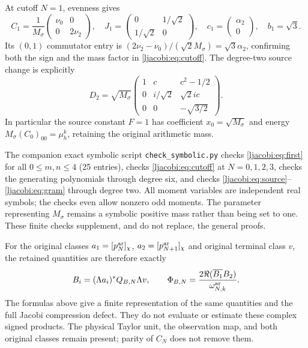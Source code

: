 At cutoff $N=1$, evenness gives
\[
 C_1=\frac1{M_\sigma}\begin{pmatrix}\nu_0&0\\0&2\nu_2\end{pmatrix},
 \quad J_1=\begin{pmatrix}0&1/\sqrt2\\1/\sqrt2&0\end{pmatrix},
 \quad c_1=\begin{pmatrix}\alpha_2\\0\end{pmatrix},\quad b_1=\sqrt3.
\]
Its $(0,1)$ commutator entry is
$(2\nu_2-\nu_0)/(\sqrt2M_\sigma)=\sqrt3\alpha_2$,
confirming both the sign and the mass factor in \eqref{ljacobi:eq:cutoff}.
The degree-two source change is explicitly
\[
 D_2=\sqrt{M_\sigma}
 \begin{pmatrix}
 1&c&c^2-1/2\\
 0&i/\sqrt2&\sqrt2ic\\
 0&0&-\sqrt{3/2}
 \end{pmatrix}.
\]
In particular the source constant $F=1$ has coefficient
$x_0=\sqrt{M_\sigma}$ and energy
$M_\sigma(C_0)_{00}=\mu_h^k$, retaining the original arithmetic mass.

The companion exact symbolic script \texttt{check\_symbolic.py}
checks \eqref{ljacobi:eq:first} for all $0\leq m,n\leq4$ (25 entries),
checks \eqref{ljacobi:eq:cutoff} at $N=0,1,2,3$, checks the generating
polynomials through degree six, and checks
\eqref{ljacobi:eq:source}--\eqref{ljacobi:eq:gram} through degree two. All moment
variables are independent real symbols; the checks even allow
nonzero odd moments. The parameter representing $M_\sigma$ remains
a symbolic positive mass rather than being set to one. These
finite checks supplement, and do not replace, the general proofs.

For the original classes $a_1=[p_N^{\rm ar}]_\chi$,
$a_2=[p_{N+1}^{\rm ar}]_\chi$ and original terminal class $v$, the
retained quantities are therefore exactly
\[
 B_i=(\Lambda a_i)^*Q_{B,N}\Lambda v,\qquad
 \Phi_{B,N}=\frac{2\Re(\overline{B_1}B_2)}{\omega_{N,k}^{\rm ar}}.
\]
The formulas above give a finite representation of the same
quantities and the full Jacobi compression defect. They do not
evaluate or estimate these complex signed products. The physical
Taylor unit, the observation map, and both original classes remain
present; parity of $C_N$ does not remove them.


\endgroup

